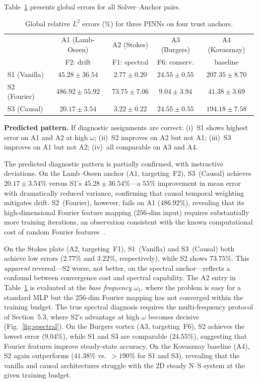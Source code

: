 \documentclass[conference]{IEEEtran}
\begin{document}
Table~\ref{tab:results} presents global errors for all Solver--Anchor pairs.

\begin{table}[t]
\centering
\caption{Global relative $L^2$ errors (\%) for three PINNs on four trust anchors.}
\label{tab:results}
\small
\begin{tabular}{@{}lcccc@{}}
\toprule
 & A1 (Lamb-Oseen) & A2 (Stokes) & A3 (Burgers) & A4 (Kovasznay) \\
 & F2: drift & F1: spectral & F6: conserv. & baseline \\
\midrule
S1 (Vanilla)  & $45.28 \pm 36.54$ & $2.77 \pm 0.20$ & $24.55 \pm 0.55$ & $207.35 \pm 8.70$ \\
S2 (Fourier)  & $486.92 \pm 55.92$ & $73.75 \pm 7.06$ & $9.04 \pm 3.94$ & $41.38 \pm 3.69$ \\
S3 (Causal)  & $20.17 \pm 3.54$ & $3.22 \pm 0.22$ & $24.55 \pm 0.55$ & $194.18 \pm 7.58$ \\
\bottomrule
\end{tabular}
\end{table}

\textbf{Predicted pattern.} If diagnostic assignments are correct: (i)~S1 shows highest error on A1 and A2 at high $\omega$; (ii)~S2 improves on A2 but not A1; (iii)~S3 improves on A1 but not A2; (iv)~all comparable on A3 and A4.

The predicted diagnostic pattern is partially confirmed, with instructive deviations. On the Lamb--Oseen anchor (A1, targeting~F2), S3~(Causal) achieves $20.17 \pm 3.54\%$ versus S1's $45.28 \pm 36.54\%$---a $55\%$ improvement in mean error with dramatically reduced variance, confirming that causal temporal weighting mitigates drift. S2~(Fourier), however, fails on A1 ($486.92\%$), revealing that its high-dimensional Fourier feature mapping ($256$-dim input) requires substantially more training iterations, an observation consistent with the known computational cost of random Fourier features~\cite{Rahaman2019}.

On the Stokes plate (A2, targeting~F1), S1~(Vanilla) and S3~(Causal) both achieve low errors ($2.77\%$ and $3.22\%$, respectively), while S2 shows $73.75\%$. This \emph{apparent} reversal---S2 worse, not better, on the spectral anchor---reflects a confound between convergence cost and spectral capability. The A2 entry in Table~\ref{tab:results} is evaluated at the \emph{base frequency} $\omega_1$, where the problem is easy for a standard MLP but the 256-dim Fourier mapping has not converged within the training budget. The true spectral diagnosis requires the multi-frequency protocol of Section~5.3, where S2's advantage at high $\omega$ becomes decisive (Fig.~\ref{fig:spectral}). On the Burgers vortex (A3, targeting~F6), S2 achieves the lowest error ($9.04\%$), while S1 and S3 are comparable ($24.55\%$), suggesting that Fourier features improve steady-state accuracy. On the Kovasznay baseline (A4), S2 again outperforms ($41.38\%$ vs.\ $>190\%$ for S1 and S3), revealing that the vanilla and causal architectures struggle with the 2D steady N--S system at the given training budget.
\end{document}
